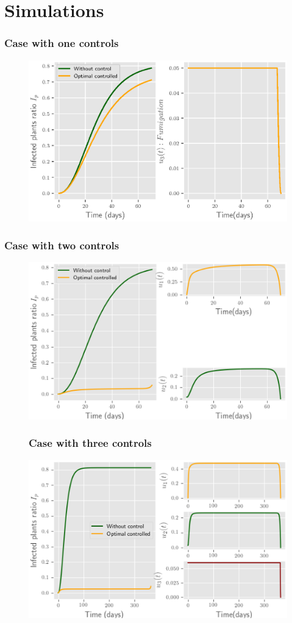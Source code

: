 \documentclass[10pt]{beamer}
\begin{document}
\section{Simulations}
	\begin{frame}
		\frametitle{Case with one controls}
		\begin{figure}
			\centering	
			\includegraphics[scale=0.5]{Feathergraphics/figure_1_tomato_one_control.eps}
		\end{figure}	
	\end{frame}
	
	\begin{frame}
		\frametitle{Case with two controls}
		\begin{figure}
			\centering	
			\includegraphics[scale=0.5]{Feathergraphics/two_control_simulation_2.eps}
		\end{figure}	
	\end{frame}
	
	\begin{frame}
		\begin{figure}
			\frametitle{Case with three controls}
			\centering	
			\includegraphics[scale=0.5]{Feathergraphics/three_controls_simulation_1.eps}
		\end{figure}	
	\end{frame}
\end{document}
